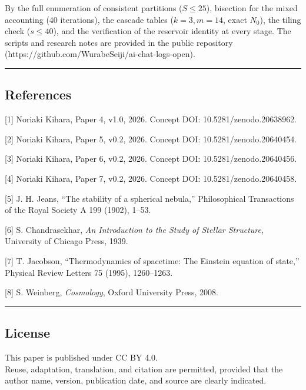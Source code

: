 \documentclass[
]{ltjsarticle}
\begin{document}
By the full enumeration of consistent partitions (\(S\le25\)), bisection
for the mixed accounting (40 iterations), the cascade tables
(\(k=3,m=14\), exact \(N_0\)), the tiling check (\(s\le40\)), and the
verification of the reservoir identity at every stage. The scripts and
research notes are provided in the public repository
(https://github.com/WurabeSeiji/ai-chat-logs-open).

\begin{center}\rule{0.5\linewidth}{0.5pt}\end{center}

\subsection{References}\label{references}

{[}1{]} Noriaki Kihara, Paper 4, v1.0, 2026. Concept DOI:
10.5281/zenodo.20638962.

{[}2{]} Noriaki Kihara, Paper 5, v0.2, 2026. Concept DOI:
10.5281/zenodo.20640454.

{[}3{]} Noriaki Kihara, Paper 6, v0.2, 2026. Concept DOI:
10.5281/zenodo.20640456.

{[}4{]} Noriaki Kihara, Paper 7, v0.2, 2026. Concept DOI:
10.5281/zenodo.20640458.

{[}5{]} J. H. Jeans, ``The stability of a spherical nebula,''
Philosophical Transactions of the Royal Society A 199 (1902), 1--53.

{[}6{]} S. Chandrasekhar, \emph{An Introduction to the Study of Stellar
Structure}, University of Chicago Press, 1939.

{[}7{]} T. Jacobson, ``Thermodynamics of spacetime: The Einstein
equation of state,'' Physical Review Letters 75 (1995), 1260--1263.

{[}8{]} S. Weinberg, \emph{Cosmology}, Oxford University Press, 2008.

\begin{center}\rule{0.5\linewidth}{0.5pt}\end{center}

\subsection{License}\label{license}

This paper is published under CC BY 4.0.\\
Reuse, adaptation, translation, and citation are permitted, provided
that the author name, version, publication date, and source are clearly
indicated.
\end{document}
